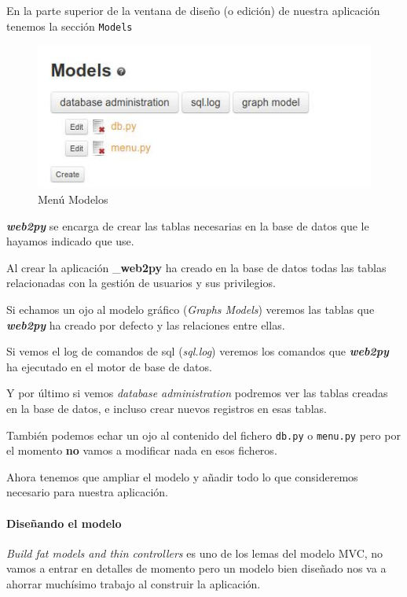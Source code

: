 \documentclass[
  12pt,
  spanish,
]{article}
\begin{document}
En la parte superior de la ventana de diseño (o edición) de nuestra
aplicación tenemos la sección \texttt{Models}

\begin{figure}
\centering
\includegraphics{src/img/models_menu.jpg}
\caption{Menú Modelos}
\end{figure}

\textbf{\emph{web2py}} se encarga de crear las tablas necesarias en la
base de datos que le hayamos indicado que use.

Al crear la aplicación \_\textbf{web2py} ha creado en la base de datos
todas las tablas relacionadas con la gestión de usuarios y sus
privilegios.

Si echamos un ojo al modelo gráfico (\emph{Graphs Models}) veremos las
tablas que \textbf{\emph{web2py}} ha creado por defecto y las relaciones
entre ellas.

Si vemos el log de comandos de sql (\emph{sql.log}) veremos los comandos
que \textbf{\emph{web2py}} ha ejecutado en el motor de base de datos.

Y por último si vemos \emph{database administration} podremos ver las
tablas creadas en la base de datos, e incluso crear nuevos registros en
esas tablas.

También podemos echar un ojo al contenido del fichero \texttt{db.py} o
\texttt{menu.py} pero por el momento \textbf{no} vamos a modificar nada
en esos ficheros.

Ahora tenemos que ampliar el modelo y añadir todo lo que consideremos
necesario para nuestra aplicación.

\hypertarget{diseuxf1ando-el-modelo}{%
\paragraph{Diseñando el modelo}\label{diseuxf1ando-el-modelo}}

\emph{Build fat models and thin controllers} es uno de los lemas del
modelo MVC, no vamos a entrar en detalles de momento pero un modelo bien
diseñado nos va a ahorrar muchísimo trabajo al construir la aplicación.
\end{document}
